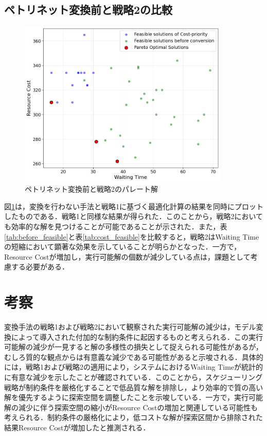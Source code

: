 \subsection{ペトリネット変換前と戦略2の比較}
\begin{figure}[H]
    \centering
    \includegraphics[width=0.8\linewidth, height=8cm]{./images/cost_and_before_job5.png}
    \caption{ペトリネット変換前と戦略2のパレート解}
    \label{fig:fig10}
\end{figure}

図\ref{fig:fig10}は，変換を行わない手法と戦略1に基づく最適化計算の結果を同時にプロットしたものである．戦略1と同様な結果が得られた．このことから，戦略2においても効率的な解を見つけることが可能であることが示された．また，表\ref{tab:before_feasible}と表\ref{tab:cost_feasible}を比較すると，戦略2はWaiting Timeの短縮において顕著な効果を示していることが明らかとなった．一方で，Resource Costが増加し，実行可能解の個数が減少している点は，課題として考慮する必要がある．

\section{考察}
変換手法の戦略1および戦略2において観察された実行可能解の減少は，モデル変換によって導入された付加的な制約条件に起因するものと考えられる．この実行可能解の減少が一見すると解の多様性の損失として捉えられる可能性があるが，むしろ質的な観点からは有意義な減少である可能性があると示唆される．具体的には，戦略1および戦略2の適用により，システムにおけるWaiting Timeが統計的に有意な減少を示したことが確認されている．このことから，スケジューリング戦略が制約条件を厳格化することで低品質な解を排除し，より効率的で質の高い解を優先するように探索空間を調整したことを示唆している．一方で，実行可能解の減少に伴う探索空間の縮小がResource Costの増加と関連している可能性も考えられる．制約条件の厳格化により，低コストな解が探索区間から排除された結果Resource Costが増加したと推測される．

